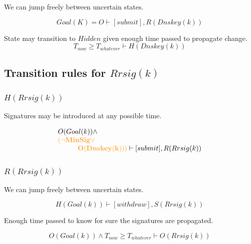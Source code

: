 \documentclass[twoside,english, a4paper]{article}
\newcommand{\highlightMinSig}[1]{\textcolor{MinSig}{\bf{#1}}}
\newcommand{\mathbox}[1]{#1}
\begin{document}
\mathbox{

	We can jump freely between uncertain states.

	\begin{equation}
			Goal(K)=O \vdash [submit], R(Dnskey(k))
	\end{equation}

	State may transition to $Hidden$ given enough time passed to propagate 
	change. 
	\begin{equation}
			T_{now} \geq T_{whatever} \vdash H(Dnskey(k))
	\end{equation}
}

\subsection{Transition rules for $Rrsig(k)$}

\subsubsection{$H(Rrsig(k))$}

\mathbox{
	Signatures may be introduced at any possible time.

	\begin{equation}
		\begin{array}{l}
			O(Goal(k)) \wedge \\
\highlightMinSig{			(\neg MinSig \vee }\\
\highlightMinSig{\hskip 1cm O(Dnskey(k))) }
\vdash [submit], R(Rrsig(k))
		\end{array}
	\end{equation}
}

\subsubsection{$R(Rrsig(k))$}

\mathbox{

	We can jump freely between uncertain states.
	
	\begin{equation}
		H(Goal(k)) \vdash [withdraw], S(Rrsig(k))
	\end{equation}

	Enough time passed to know for sure the signatures are propagated.
	
	\begin{equation}
		O(Goal(k)) \wedge T_{now} \geq T_{whatever} \vdash O(Rrsig(k))
	\end{equation}
}
\end{document}
